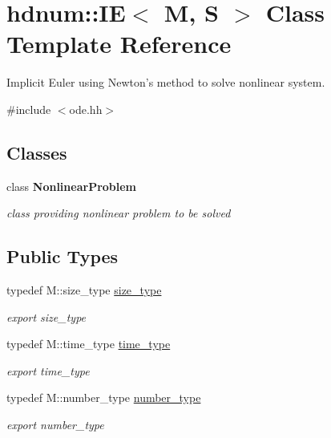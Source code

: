\hypertarget{classhdnum_1_1IE}{
\section{hdnum::IE$<$ M, S $>$ Class Template Reference}
\label{classhdnum_1_1IE}
}


Implicit Euler using Newton's method to solve nonlinear system.  




{\ttfamily \#include $<$ode.hh$>$}

\subsection*{Classes}
\begin{DoxyCompactItemize}
\item 
class {\bfseries NonlinearProblem}
\begin{DoxyCompactList}\small\item\em class providing nonlinear problem to be solved \item\end{DoxyCompactList}\end{DoxyCompactItemize}
\subsection*{Public Types}
\begin{DoxyCompactItemize}
\item 
\hypertarget{classhdnum_1_1IE_af2d3dd8c57bb78dfd28a613dd11f499a}{
typedef M::size\_\-type \hyperlink{classhdnum_1_1IE_af2d3dd8c57bb78dfd28a613dd11f499a}{size\_\-type}}
\label{classhdnum_1_1IE_af2d3dd8c57bb78dfd28a613dd11f499a}

\begin{DoxyCompactList}\small\item\em export size\_\-type \item\end{DoxyCompactList}\item 
\hypertarget{classhdnum_1_1IE_a4a58f86ec61809cbca7b16922dcbb39e}{
typedef M::time\_\-type \hyperlink{classhdnum_1_1IE_a4a58f86ec61809cbca7b16922dcbb39e}{time\_\-type}}
\label{classhdnum_1_1IE_a4a58f86ec61809cbca7b16922dcbb39e}

\begin{DoxyCompactList}\small\item\em export time\_\-type \item\end{DoxyCompactList}\item 
\hypertarget{classhdnum_1_1IE_a23de7a983f5419c37d8530d49cab4913}{
typedef M::number\_\-type \hyperlink{classhdnum_1_1IE_a23de7a983f5419c37d8530d49cab4913}{number\_\-type}}
\label{classhdnum_1_1IE_a23de7a983f5419c37d8530d49cab4913}

\begin{DoxyCompactList}\small\item\em export number\_\-type \item\end{DoxyCompactList}\end{DoxyCompactItemize}

